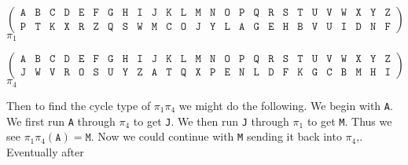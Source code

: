 \begin{center}
  \[
    \left(
      \begin{array}{llllllllllllllllllllllllll}
        \texttt{A} & \texttt{B} & \texttt{C} & \texttt{D} &
        \texttt{E} & \texttt{F} & \texttt{G} & \texttt{H} &
        \texttt{I} & \texttt{J} & \texttt{K} & \texttt{L} &
        \texttt{M} & \texttt{N} & \texttt{O} & \texttt{P} &
        \texttt{Q} & \texttt{R} & \texttt{S} & \texttt{T} &
        \texttt{U} & \texttt{V} & \texttt{W} & \texttt{X} &
        \texttt{Y} & \texttt{Z}                             \\
        \texttt{P} & \texttt{T} & \texttt{K} & \texttt{X} &
        \texttt{R} & \texttt{Z} & \texttt{Q} & \texttt{S} &
        \texttt{W} & \texttt{M} & \texttt{C} & \texttt{O} &
        \texttt{J} & \texttt{Y} & \texttt{L} & \texttt{A} &
        \texttt{G} & \texttt{E} & \texttt{H} & \texttt{B} &
        \texttt{V} & \texttt{U} & \texttt{I} & \texttt{D} &
        \texttt{N} & \texttt{F}
      \end{array}
    \right)
  \]
  $\pi_1$
\end{center}
\begin{center}
  \[
    \left(
      \begin{array}{llllllllllllllllllllllllll}
        \texttt{A} & \texttt{B} & \texttt{C} & \texttt{D} &
        \texttt{E} & \texttt{F} & \texttt{G} & \texttt{H} &
        \texttt{I} & \texttt{J} & \texttt{K} & \texttt{L} &
        \texttt{M} & \texttt{N} & \texttt{O} & \texttt{P} &
        \texttt{Q} & \texttt{R} & \texttt{S} & \texttt{T} &
        \texttt{U} & \texttt{V} & \texttt{W} & \texttt{X} &
        \texttt{Y} & \texttt{Z}                             \\
        \texttt{J} & \texttt{W} & \texttt{V} & \texttt{R} &
        \texttt{O} & \texttt{S} & \texttt{U} & \texttt{Y} &
        \texttt{Z} & \texttt{A} & \texttt{T} & \texttt{Q} &
        \texttt{X} & \texttt{P} & \texttt{E} & \texttt{N} &
        \texttt{L} & \texttt{D} & \texttt{F} & \texttt{K} &
        \texttt{G} & \texttt{C} & \texttt{B} & \texttt{M} &
        \texttt{H} & \texttt{I}
      \end{array}
    \right)
  \]
  $\pi_4$
\end{center}
Then to find the cycle type of $\pi_1\pi_4$ we might do the
following. We begin with \texttt{A}. We first run \texttt{A} through
$\pi_4$ to get \texttt{J}. We then run \texttt{J} through
$\pi_1$ to get \texttt{M}. Thus we see
$\pi_1\pi_4(\texttt{A}) = \texttt{M}$. Now we could continue
with \texttt{M} sending it back into $\pi_4$,. Eventually after
